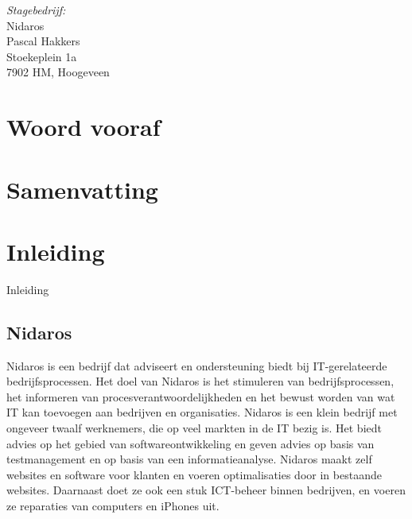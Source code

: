 \documentclass[a4paper,11pt,oneside]{report}
\begin{document}
\emph{Stagebedrijf:}\\
  Nidaros\\
	Pascal Hakkers\\
	Stoekeplein 1a\\
	7902 HM, Hoogeveen



\chapter*{Woord vooraf}
\lipsum[1]

\chapter*{Samenvatting}
\lipsum[1]





\newpage
\renewcommand*\contentsname{Inhoud}
\tableofcontents
\cleardoublepage
{}





\chapter{Inleiding}
Inleiding


\section{Nidaros}
Nidaros is een bedrijf dat adviseert en ondersteuning biedt bij IT-gerelateerde bedrijfsprocessen. Het doel van Nidaros is het stimuleren van bedrijfsprocessen, het informeren van procesverantwoordelijkheden en het bewust worden van wat IT kan toevoegen aan bedrijven en organisaties. Nidaros is een klein bedrijf met ongeveer twaalf werknemers, die op veel markten in de IT bezig is. Het biedt advies op het gebied van softwareontwikkeling en geven advies op basis van testmanagement en op basis van een informatieanalyse. Nidaros maakt zelf websites en software voor klanten en voeren optimalisaties door in bestaande websites. Daarnaast doet ze ook een stuk ICT-beheer binnen bedrijven, en voeren ze reparaties van computers en iPhones uit.
\end{document}
